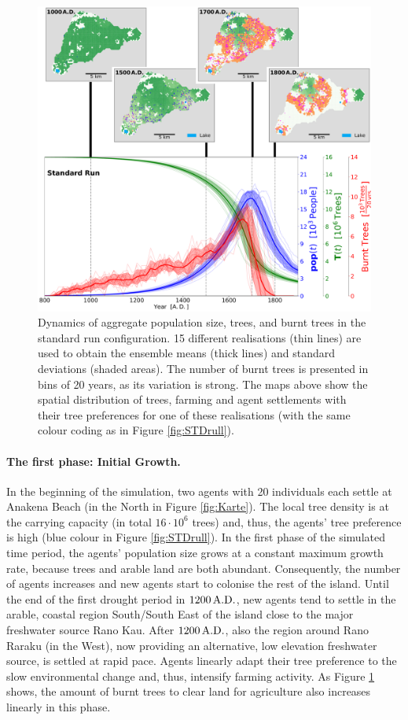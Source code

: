 \begin{figure}
	\centering
	\includegraphics[width=1.\linewidth, center]{images/Results/Standard/EnsembleStatistics+Panels}
	\caption{
		Dynamics of aggregate population size, trees, and burnt trees in the standard run configuration. 15 different realisations (thin lines) are used to obtain the ensemble means (thick lines) and standard deviations (shaded areas). 
		The number of burnt trees is presented in bins of 20 years, as its variation is strong.
		The maps above show the spatial distribution of trees, farming and agent settlements with their tree preferences for one of these realisations (with the same colour coding as in Figure \ref{fig:STDrull}).}
	\label{fig:STDstats}
\end{figure}


\paragraph{The first phase: Initial Growth.}
In the beginning of the simulation, two agents with 20 individuals each settle at Anakena Beach (in the North in Figure \ref{fig:Karte}). 
The local tree density is at the carrying capacity (in total $16\cdot 10^6$ trees) and, thus, the agents' tree preference is high (blue colour in Figure \ref{fig:STDrull}).
In the first phase of the simulated time period, the agents' population size grows at a constant maximum growth rate, because trees and arable land are both abundant. 
Consequently, the number of agents increases and new agents start to colonise the rest of the island. 
Until the end of the first drought period in $1200\, {\rm A.D.}$, new agents tend to settle in the arable, coastal region South/South East of the island close to the major freshwater source Rano Kau. 
After $1200\, {\rm A.D.}$, also the region around Rano Raraku (in the West), now providing an alternative, low elevation freshwater source, is settled at rapid pace.
Agents linearly adapt their tree preference to the slow environmental change and, thus, intensify farming activity.
As Figure \ref{fig:STDstats} shows, the amount of burnt trees to clear land for agriculture also increases linearly in this phase.

